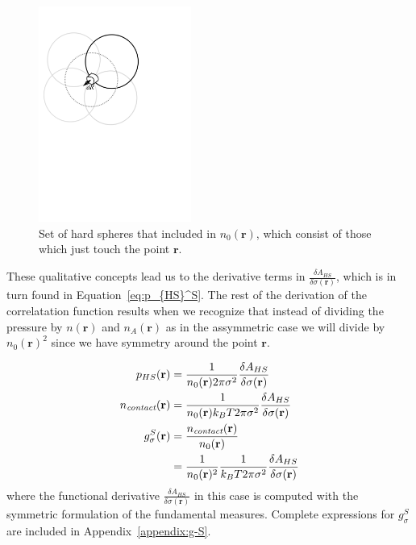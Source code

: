 \documentclass[letterpaper,twocolumn,amsmath,amssymb,jcp,10pt,aip]{revtex4-1}
\newcommand{\rr}{\textbf{r}}
\begin{document}
\begin{figure}
\includegraphics[width=5cm]{figs/contact}
\caption{Set of hard spheres that included in $n_0(\mathbf{r})$, which
  consist of those which just touch the point $\mathbf{r}$.}
\label{fig:contact}
\end{figure}

These qualitative concepts lead us to the derivative terms in $\frac{\delta A_{HS}}{\delta \sigma(\mathbf{r})}$,
which is in turn found in Equation~\ref{eq:p_{HS}^S}.  The rest of the
derivation of the correlatation function results when we recognize that
instead of dividing the pressure by $n(\mathbf{r})$ and $n_A(\mathbf{r})$
as in the assymmetric case we will divide by $n_0(\mathbf{r})^2$
since we have symmetry around the point $\mathbf{r}$.

\begin{align}
  p_{HS}(\mathbf{r}) &= \frac{1}{n_0(\rr) 2\pi \sigma^2} \frac{\delta
    A_{HS}}{\delta \sigma(\mathbf{r})} \label{eq:p_{HS}^S}\\
  \ncontact(\rr) &= \frac{1}{n_0(\rr) k_BT 2\pi \sigma^2} \frac{\delta
    A_{HS}}{\delta \sigma(\mathbf{r})} \\
  g_\sigma^S(\rr) &= \frac{\ncontact(\rr)}{n_0(\rr)} \\
  &= \frac{1}{n_0(\rr)^2}\frac{1}{ k_BT 2\pi \sigma^2} \frac{\delta
    A_{HS}}{\delta \sigma(\mathbf{r})} \label{eq:g-A-exact}
\end{align}
where the functional derivative $\frac{\delta A_{HS}}{\delta
  \sigma(\mathbf{r})}$ in this case is computed with the symmetric
formulation of the fundamental measures.  Complete expressions for
$g_\sigma^S$ are included in Appendix~\ref{appendix:g-S}.\\
\end{document}

